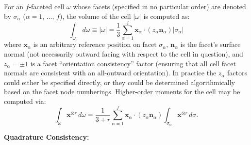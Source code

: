 \documentclass[11pt]{article} %
\begin{document}
For an $f$-faceted cell $\omega$ whose facets (specified in no particular order) are denoted by $\sigma_\alpha$ ($\alpha = 1, \, \ldots, \, f$), the volume of the cell $|\omega|$ is computed as:
\begin{equation}
	\int_{\omega} \, d \omega \equiv | \omega | = \frac{1}{3} \sum_{\alpha=1}^f \mathbf{x}_{\alpha} \cdot (z_\alpha \mathbf{n}_{\alpha}) | \sigma_{\alpha} |
\end{equation}
where $\mathbf{x}_\alpha$ is an arbitrary reference position on facet $\sigma_\alpha$, $\mathbf{n}_\alpha$ is the facet's surface normal (not necessarily outward facing with respect to the cell in question), and $z_\alpha = \pm 1$ is a facet ``orientation consistency'' factor (ensuring that all cell facet normals are consistent with an all-outward orientation). In practice the $z_\alpha$ factors could either be specified directly, or they could be determined algorithmically based on the facet node numberings. Higher-order moments for the cell may be computed via:
\begin{equation}
	\int_{\omega} \mathbf{x}^{\otimes r} \, d \omega = \frac{1}{3+r} \sum_{\alpha=1}^f \mathbf{x}_{\alpha} \cdot (z_\alpha \mathbf{n}_{\alpha}) \int_{\sigma_{\alpha}} \mathbf{x}^{\otimes r} \, d \sigma .
\end{equation}

\newpage

\begin{center}
\textbf{Quadrature Consistency:}
\end{center}
\end{document}

